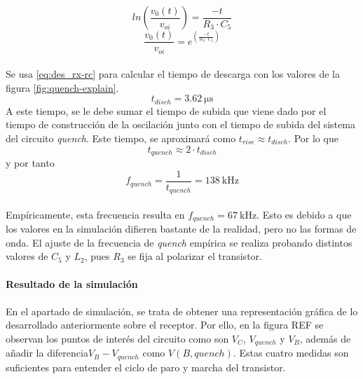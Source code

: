 \begin{equation}
   \label{eq:des_rx-rc}
   ln \left( \frac{v_0(t)}{v_{oi}} \right) = \frac{-t}{R_3 \cdot C_5}
\end{equation}
\begin{equation}
   \frac{v_0(t)}{v_{oi}} = e^{\left( \frac{-t}{R_3 \cdot C_5} \right)}
\end{equation}

\paragraph{}
Se usa \ref{eq:des_rx-rc} para calcular el tiempo de descarga con los valores de la figura \ref{fig:quench-explain}.
$$ t_{disch} = \SI{3.62}{\micro\second} $$
A este tiempo, se le debe sumar el tiempo de subida que viene dado por el tiempo de construcción de la oscilación junto con el tiempo de subida del sistema del circuito \textit{quench}.
Este tiempo, se aproximar\'a como $t_{rise} \approx t_{disch}$. Por lo que $$t_{quench} \approx 2 \cdot t_{disch}$$ y por tanto $$f_{quench} = \frac{1}{t_{quench}}  = \SI{138}{\kilo\hertz} $$
\paragraph{}
Empíricamente, esta frecuencia resulta en $f_{quench} = \SI{67}{\kilo\hertz}$. Esto es debido a que los valores en la simulación difieren bastante de la realidad, pero no las formas de onda. El ajuste de la frecuencia de \textit{quench} empírica se realiza probando distintos valores de $C_5$ y $L_2$, pues $R_3$ se fija al polarizar el transistor.

\paragraph{Resultado de la simulaci\'on} 
\paragraph{}
En el apartado de simulación, se trata de obtener una representación gráfica de lo desarrollado anteriormente sobre el receptor. Por ello, en la figura REF se observan los puntos de interés del circuito como son $V_C$, $V_{quench}$ y $V_{B}$, además de añadir la diferencia$V_B - V_{quench}$ como $V(B,quench)$. Estas cuatro medidas son suficientes para entender el ciclo de paro y marcha del transistor.
